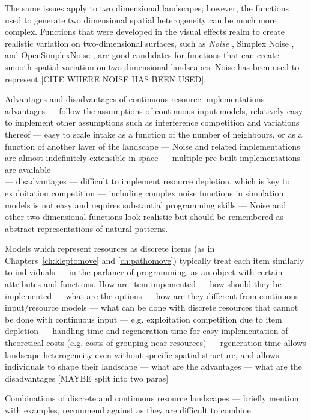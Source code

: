 The same issues apply to two dimensional landscapes; however, the functions used to generate two dimensional spatial heterogeneity can be much more complex.
Functions that were developed in the visual effects realm to create realistic variation on two-dimensional surfaces, such as \textit{Noise} \citep{perlin}, Simplex Noise \citep{simplexnoise}, and OpenSimplexNoise \citep{opensimplexnoise}, are good candidates for functions that can create smooth spatial variation on two dimensional landscapes.
Noise has been used to represent [CITE WHERE NOISE HAS BEEN USED].

Advantages and disadvantages of continuous resource implementations --- advantages --- follow the assumptions of continuous input models, relatively easy to implement other assumptions such as interference competition and variations thereof \citep{tregenza1995,vandermeer1997} --- easy to scale intake as a function of the number of neighbours, or as a function of another layer of the landscape --- Noise and related implementations are almost indefinitely extensible in space --- multiple pre-built implementations are available\\
--- disadvantages --- difficult to implement resource depletion, which is key to exploitation competition --- including complex noise functions in simulation models is not easy and requires substantial programming skills --- Noise and other two dimensional functions look realistic but should be remembered as abstract representations of natural patterns.

Models which represent resources as discrete items (as in Chapters~\ref{ch:kleptomove} and \ref{ch:pathomove}) typically treat each item similarly to individuals --- in the parlance of programming, as an object with certain attributes and functions.
How are item impemented --- how should they be implemented --- what are the options --- how are they different from continuous input/resource models --- what can be done with discrete resources that cannot be done with continuous input --- e.g. exploitation competition due to item depletion --- handling time and regeneration time for easy implementation of theoretical costs (e.g. costs of grouping near resources) --- rgeneration time allows landscape heterogeneity even without specific spatial structure, and allows individuals to shape their landscape --- what are the advantages --- what are the disadvantages [MAYBE split into two paras]

Combinations of discrete and continuous resource landscapes --- briefly mention with examples, recommend against as they are difficult to combine.

